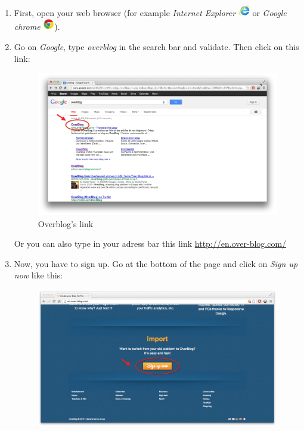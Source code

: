 \documentclass[a4paper,10pt]{article}
\begin{document}
\begin{enumerate}
\item First, open your web browser (for example \emph{Internet Explorer} \includegraphics[width=0.5cm]{Images/explorer.png} or \emph{Google chrome} \includegraphics[width=0.5cm]{Images/chrome.png}).
\item Go on \emph{Google}, type \emph{overblog} in the search bar and validate. Then click on this link:
\begin{figure}[H]
    \center
	\includegraphics[width=13cm]{Images/linkOverblog.png}
    \caption{Overblog's link}
\end{figure}
Or you can also type in your adress bar this link \url{http://en.over-blog.com/}
\item Now, you have to sign up. Go at the bottom of the page and click on \emph{Sign up now} like this:
\begin{figure}[H]
    \center
	\includegraphics[width=13cm]{Images/signUpButton.png}

\end{figure}
\end{enumerate}
\end{document}
